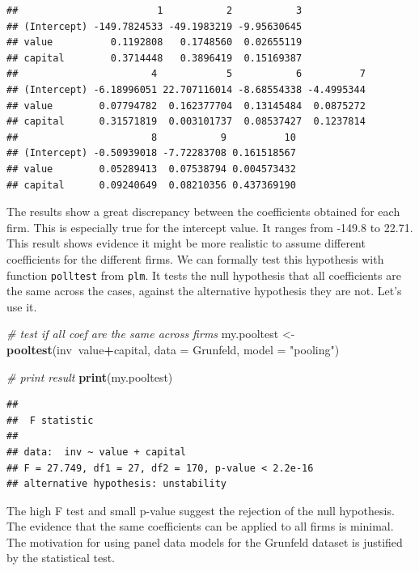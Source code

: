 \documentclass[11pt,]{book}
\newenvironment{Shaded}{\begin{snugshade}}{\end{snugshade}}
\newcommand{\KeywordTok}[1]{\textcolor[rgb]{0.27,0.27,0.27}{\textbf{#1}}}
\newcommand{\DataTypeTok}[1]{\textcolor[rgb]{0.27,0.27,0.27}{#1}}
\newcommand{\StringTok}[1]{\textcolor[rgb]{0.5,0.5,0.5}{#1}}
\newcommand{\CommentTok}[1]{\textcolor[rgb]{0.56,0.35,0.01}{\textit{#1}}}
\newcommand{\OperatorTok}[1]{\textcolor[rgb]{0.81,0.36,0.00}{\textbf{#1}}}
\newcommand{\NormalTok}[1]{#1}
\begin{document}
\begin{verbatim}
##                        1           2           3
## (Intercept) -149.7824533 -49.1983219 -9.95630645
## value          0.1192808   0.1748560  0.02655119
## capital        0.3714448   0.3896419  0.15169387
##                       4            5           6          7
## (Intercept) -6.18996051 22.707116014 -8.68554338 -4.4995344
## value        0.07794782  0.162377704  0.13145484  0.0875272
## capital      0.31571819  0.003101737  0.08537427  0.1237814
##                       8           9          10
## (Intercept) -0.50939018 -7.72283708 0.161518567
## value        0.05289413  0.07538794 0.004573432
## capital      0.09240649  0.08210356 0.437369190
\end{verbatim}

The results show a great discrepancy between the coefficients obtained
for each firm. This is especially true for the intercept value. It
ranges from -149.8 to 22.71. This result shows evidence it might be more
realistic to assume different coefficients for the different firms. We
can formally test this hypothesis with function \texttt{polltest} from
\texttt{plm}. It tests the null hypothesis that all coefficients are the
same across the cases, against the alternative hypothesis they are not.
Let's use it.

\begin{Shaded}
\begin{Highlighting}[]
\CommentTok{# test if all coef are the same across firms}
\NormalTok{my.pooltest <-}\StringTok{ }\KeywordTok{pooltest}\NormalTok{(inv}\OperatorTok{~}\NormalTok{value}\OperatorTok{+}\NormalTok{capital, }
                        \DataTypeTok{data =}\NormalTok{ Grunfeld, }
                        \DataTypeTok{model =} \StringTok{"pooling"}\NormalTok{)}

\CommentTok{# print result}
\KeywordTok{print}\NormalTok{(my.pooltest)}
\end{Highlighting}
\end{Shaded}

\begin{verbatim}
## 
##  F statistic
## 
## data:  inv ~ value + capital
## F = 27.749, df1 = 27, df2 = 170, p-value < 2.2e-16
## alternative hypothesis: unstability
\end{verbatim}

The high F test and small p-value suggest the rejection of the null
hypothesis. The evidence that the same coefficients can be applied to
all firms is minimal. The motivation for using panel data models for the
Grunfeld dataset is justified by the statistical test.
\end{document}
